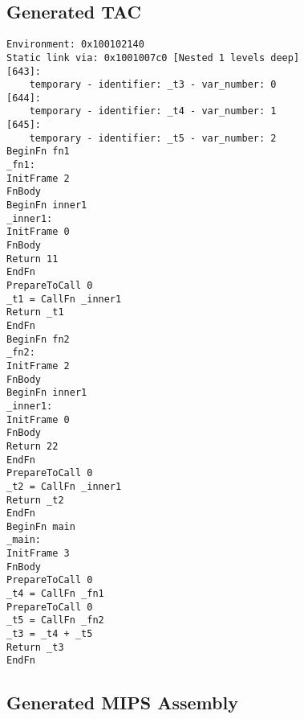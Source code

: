 \subsection{Generated TAC}
\begin{verbatim}
Environment: 0x100102140
Static link via: 0x1001007c0 [Nested 1 levels deep]
[643]:
	temporary - identifier: _t3 - var_number: 0
[644]:
	temporary - identifier: _t4 - var_number: 1
[645]:
	temporary - identifier: _t5 - var_number: 2
BeginFn fn1
_fn1:
InitFrame 2
FnBody
BeginFn inner1
_inner1:
InitFrame 0
FnBody
Return 11
EndFn
PrepareToCall 0
_t1 = CallFn _inner1
Return _t1
EndFn
BeginFn fn2
_fn2:
InitFrame 2
FnBody
BeginFn inner1
_inner1:
InitFrame 0
FnBody
Return 22
EndFn
PrepareToCall 0
_t2 = CallFn _inner1
Return _t2
EndFn
BeginFn main
_main:
InitFrame 3
FnBody
PrepareToCall 0
_t4 = CallFn _fn1
PrepareToCall 0
_t5 = CallFn _fn2
_t3 = _t4 + _t5
Return _t3
EndFn
\end{verbatim}\subsection{Generated MIPS Assembly}
